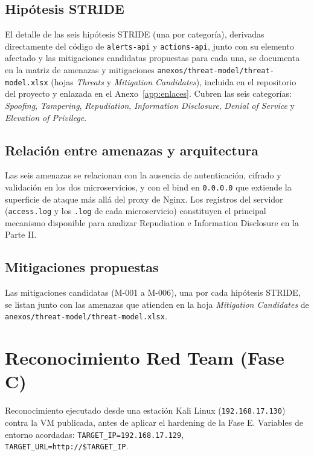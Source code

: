 \documentclass[journal]{IEEEtran}
\begin{document}
\subsection{Hipótesis STRIDE}

El detalle de las seis hipótesis STRIDE (una por categoría), derivadas
directamente del código de \texttt{alerts-api} y \texttt{actions-api}, junto
con su elemento afectado y las mitigaciones candidatas propuestas para cada
una, se documenta en la matriz de amenazas y mitigaciones
\texttt{anexos/threat-model/threat-model.xlsx} (hojas \textit{Threats} y
\textit{Mitigation Candidates}), incluida en el repositorio del proyecto y
enlazada en el Anexo~\ref{app:enlaces}.
Cubren las seis categorías: \textit{Spoofing}, \textit{Tampering},
\textit{Repudiation}, \textit{Information Disclosure}, \textit{Denial of
Service} y \textit{Elevation of Privilege}.

\subsection{Relación entre amenazas y arquitectura}

Las seis amenazas se relacionan con la ausencia de autenticación, cifrado y
validación en los dos microservicios, y con el bind en \texttt{0.0.0.0} que
extiende la superficie de ataque más allá del proxy de Nginx. Los registros
del servidor (\texttt{access.log} y los \texttt{.log} de cada microservicio)
constituyen el principal mecanismo disponible para analizar Repudiation e
Information Disclosure en la Parte II.

\subsection{Mitigaciones propuestas}

Las mitigaciones candidatas (M-001 a M-006), una por cada hipótesis STRIDE,
se listan junto con las amenazas que atienden en la hoja \textit{Mitigation
Candidates} de \texttt{anexos/threat-model/threat-model.xlsx}.

\section{Reconocimiento Red Team (Fase C)}
\label{sec:redteam}

Reconocimiento ejecutado desde una estación Kali Linux (\texttt{192.168.17.130})
contra la VM publicada, antes de aplicar el hardening de la Fase E. Variables
de entorno acordadas: \texttt{TARGET\_IP=192.168.17.129},
\texttt{TARGET\_URL=http://\$TARGET\_IP}.
\end{document}

